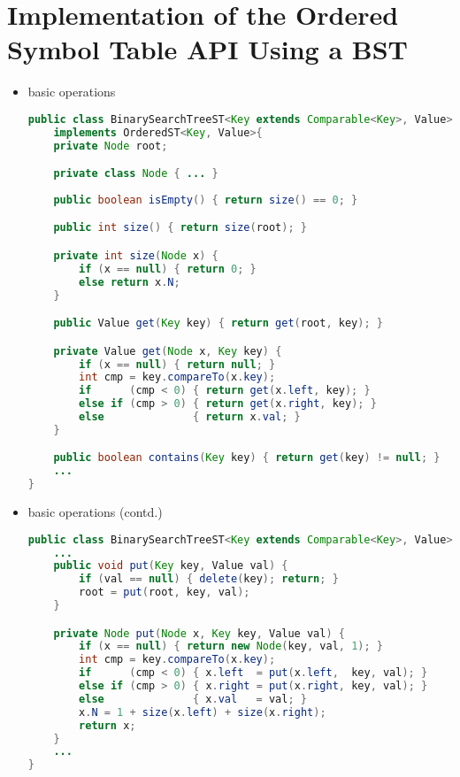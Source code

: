 \documentclass[8pt,a4paper,compress]{beamer}
\begin{document}
\section{Implementation of the Ordered Symbol Table API Using a BST}
\begin{frame}[fragile]
\begin{itemize}
\item basic operations
\begin{lstlisting}[language=Java]
public class BinarySearchTreeST<Key extends Comparable<Key>, Value> 
    implements OrderedST<Key, Value>{
    private Node root;

    private class Node { ... }
    
    public boolean isEmpty() { return size() == 0; }

    public int size() { return size(root); }

    private int size(Node x) {
        if (x == null) { return 0; }
        else return x.N;
    }

    public Value get(Key key) { return get(root, key); }

    private Value get(Node x, Key key) {
        if (x == null) { return null; }
        int cmp = key.compareTo(x.key);
        if      (cmp < 0) { return get(x.left, key); }
        else if (cmp > 0) { return get(x.right, key); }
        else              { return x.val; }
    }

    public boolean contains(Key key) { return get(key) != null; }
    ...
}
\end{lstlisting}
\end{itemize}
\end{frame}

\begin{frame}[fragile]
\begin{itemize}
\item basic operations (contd.)
\begin{lstlisting}[language=Java]
public class BinarySearchTreeST<Key extends Comparable<Key>, Value> 
    ...
    public void put(Key key, Value val) {
        if (val == null) { delete(key); return; }
        root = put(root, key, val);
    }

    private Node put(Node x, Key key, Value val) {
        if (x == null) { return new Node(key, val, 1); }
        int cmp = key.compareTo(x.key);
        if      (cmp < 0) { x.left  = put(x.left,  key, val); }
        else if (cmp > 0) { x.right = put(x.right, key, val); }
        else              { x.val   = val; }
        x.N = 1 + size(x.left) + size(x.right);
        return x;
    }
    ...
}
\end{lstlisting}
\end{itemize}
\end{frame}
\end{document}
